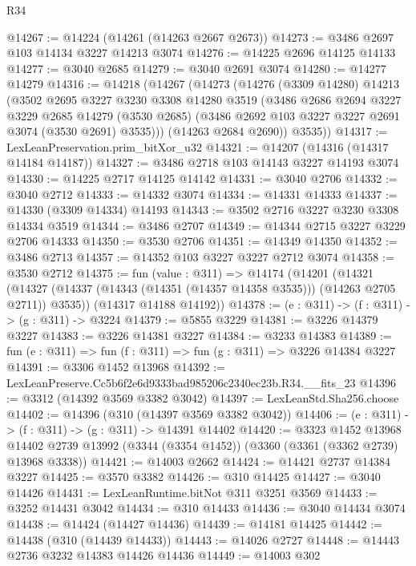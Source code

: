 \begin{lexlean}{R34}
\begin{coremodule}
@14267 := @14224 (@14261 (@14263 @2667 @2673))
@14273 := @3486 @2697 @103 @14134 @3227 @14213 @3074
@14276 := @14225 @2696 @14125 @14133
@14277 := @3040 @2685
@14279 := @3040 @2691 @3074
@14280 := @14277 @14279
@14316 := @14218
    (@14267
      (@14273
        (@14276
          (@3309 @14280)
          @14213
          (@3502
            @2695
            @3227
            @3230
            @3308
            @14280
            @3519
            (@3486
              @2686
              @2694
              @3227
              @3229
              @2685
              @14279
              (@3530 @2685)
              (@3486 @2692 @103 @3227 @3227 @2691 @3074 (@3530 @2691) @3535)))
          (@14263 @2684 @2690))
        @3535))
@14317 := LexLeanPreservation.prim_bitXor_u32
@14321 := @14207 (@14316 (@14317 @14184 @14187))
@14327 := @3486 @2718 @103 @14143 @3227 @14193 @3074
@14330 := @14225 @2717 @14125 @14142
@14331 := @3040 @2706
@14332 := @3040 @2712
@14333 := @14332 @3074
@14334 := @14331 @14333
@14337 := @14330 (@3309 @14334) @14193
@14343 := @3502 @2716 @3227 @3230 @3308 @14334 @3519
@14344 := @3486 @2707
@14349 := @14344 @2715 @3227 @3229 @2706 @14333
@14350 := @3530 @2706
@14351 := @14349 @14350
@14352 := @3486 @2713
@14357 := @14352 @103 @3227 @3227 @2712 @3074
@14358 := @3530 @2712
@14375 := fun (value : @311) =>
  @14174
    (@14201
      (@14321 (@14327 (@14337 (@14343 (@14351 (@14357 @14358 @3535))) (@14263 @2705 @2711)) @3535))
      (@14317 @14188 @14192))
@14378 := (e : @311) -> (f : @311) -> (g : @311) -> @3224
@14379 := @5855 @3229
@14381 := @3226 @14379 @3227
@14383 := @3226 @14381 @3227
@14384 := @3233 @14383
@14389 := fun (e : @311) => fun (f : @311) => fun (g : @311) => @3226 @14384 @3227
@14391 := @3306 @1452 @13968
@14392 := LexLeanPreserve.Cc5b6f2e6d9333bad985206c2340ec23b.R34.__fits_23
@14396 := @3312 (@14392 @3569 @3382 @3042)
@14397 := LexLeanStd.Sha256.choose
@14402 := @14396 (@310 (@14397 @3569 @3382 @3042))
@14406 := (e : @311) -> (f : @311) -> (g : @311) -> @14391 @14402
@14420 := @3323
    @1452
    @13968
    @14402
    @2739
    @13992
    (@3344 (@3354 @1452))
    (@3360 (@3361 (@3362 @2739) @13968 @3338))
@14421 := @14003 @2662
@14424 := @14421 @2737 @14384 @3227
@14425 := @3570 @3382
@14426 := @310 @14425
@14427 := @3040 @14426
@14431 := LexLeanRuntime.bitNot @311 @3251 @3569
@14433 := @3252 @14431 @3042
@14434 := @310 @14433
@14436 := @3040 @14434 @3074
@14438 := @14424 (@14427 @14436)
@14439 := @14181 @14425
@14442 := @14438 (@310 (@14439 @14433))
@14443 := @14026 @2727
@14448 := @14443 @2736 @3232 @14383 @14426 @14436
@14449 := @14003 @302

\end{coremodule}
\end{lexlean}
